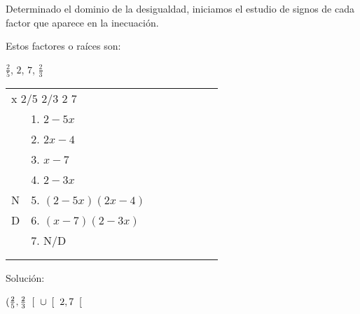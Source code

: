 \documentclass[12pt]{article}
\begin{document}
Determinado el dominio de la desigualdad, iniciamos el estudio de signos de cada factor que aparece en la inecuación. 

\vspace{0.1cm}

Estos factores o raíces son: 

\vspace{0.7cm}

\begin{center}
    {\LARGE{$\frac{2}{5}$}}, $2$, $7$, {\LARGE{$\frac{2}{3}$}}
\end{center} 

\vspace{0.7cm}


\begin{table}[H]
\centering
\begin{tabular}{l|l|l|l|l|l|l|l}
\multicolumn{8}{l}{\hspace{2cm} x \hspace{2.3cm} {\tiny{2/5}} \hspace{.1cm} {\tiny{2/3}} \hspace{.19cm} {\tiny{2}} \hspace{.35cm} {\tiny{7}} }                                                      \\ 
\cline{2-7}
                        & 1. $2-5x$ & {\blue{+}}  & {\red{$-$}} & {\red{$-$}} & {\red{$-$}} & {\red{$-$}} &   \\ 
\cline{2-7}
                        & 2. $2x-4$ & {\red{$-$}} & {\red{$-$}}  & {\red{$-$}} & {\blue{+}}  & {\blue{+}} &   \\ 
\cline{2-7}
                        & 3. $x-7$  & {\red{$-$}}  & {\red{$-$}}& {\red{$-$}} & {\red{$-$}}& {\blue{+}} &   \\ 
\cline{2-7}
                        & 4. $2-3x$ & {\blue{+}}   & {\blue{+}} & {\red{$-$}} & {\red{$-$}} & {\red{$-$}} &   \\ 
\cline{1-7}
\multicolumn{1}{|l|}{N} & 5. $(2-5x)(2x-4)$    & {\red{$-$}} & {\blue{+}} & {\blue{+}} & {\red{$-$}} & {\red{$-$}} &   \\ 
\cline{1-7}
\multicolumn{1}{|l|}{D} & 6. $(x-7)(2-3x)$   & {\red{$-$}} & {\red{$-$}}  & {\blue{+}}  & {\blue{+}}  & {\red{$-$}} &   \\ 
\cline{1-7}
                        & 7. N/D & {\blue{+}}  & {\red{$-$}}  & {\blue{+}}  & {\red{$-$}} & {\blue{+}}  &   \\ 
\cline{2-7}
\multicolumn{1}{l}{}    & \multicolumn{1}{l}{} & \multicolumn{1}{l}{} & \multicolumn{1}{l}{} & \multicolumn{1}{l}{} & \multicolumn{1}{l}{} & \multicolumn{1}{l}{} &   \\
\multicolumn{1}{l}{}    & \multicolumn{1}{l}{} & \multicolumn{1}{l}{} & \multicolumn{1}{l}{} & \multicolumn{1}{l}{} & \multicolumn{1}{l}{} & \multicolumn{1}{l}{} &  
\end{tabular}
\end{table} \vspace{1cm}

Solución: 

\begin{center}
    $ (\frac{2}{5}, \frac{2}{3}\hspace{0.2cm}[\hspace{0.2cm}\cup$ $[\hspace{0.2cm} 2, 7\hspace{0.2cm}[$
\end{center} 
\end{document}
